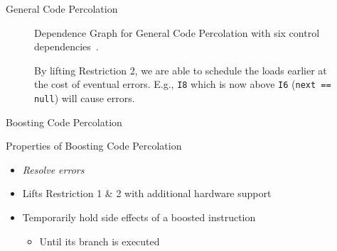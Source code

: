 \documentclass[presentation]{beamer}
\begin{document}
\begin{frame}{General Code Percolation}
    \begin{center}
    \begin{minipage}{.52\textwidth}
        \begin{figure}[H]
            \centering
            
            \caption{Dependence Graph for General Code Percolation with six control dependencies~\cite{chang95}.}
\end{figure}
    \end{minipage}\hfill
    \begin{minipage}{.46\textwidth}
\begin{figure}[H]
            \centering
            \resizebox{1\textwidth}{!}{
            
        }
        \caption{By lifting Restriction 2, we are able to schedule the loads earlier at the cost of eventual errors. E.g., \texttt{I8} which is now above \texttt{I6} (\texttt{next == null}) will cause errors.}
\end{figure}
    \end{minipage}
\end{center} 
\end{frame}

\begin{frame}{Boosting Code Percolation}
    \begin{block}{Properties of Boosting Code Percolation}
        \begin{itemize}
            \item \textit{Resolve errors}
            \item Lifts Restriction 1 \& 2 with additional hardware support
            \item Temporarily hold side effects of a boosted instruction
            \begin{itemize}
                \item Until its branch is executed 
            \end{itemize}
        \end{itemize}
    \end{block}
\end{frame}
\end{document}
